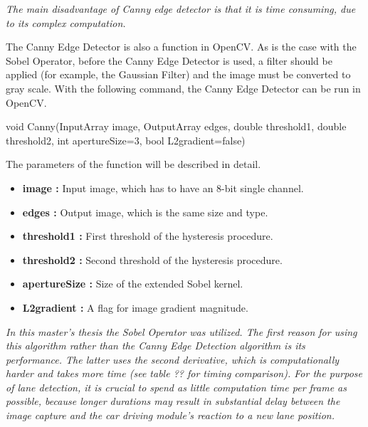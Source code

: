 \emph{\color{red}The main disadvantage of Canny edge detector is that it is time consuming, due to its complex computation. }






The Canny Edge Detector is also a function in OpenCV. As is the case with the Sobel Operator, before the Canny Edge Detector is used, a filter should be applied (for example, the Gaussian Filter) and the image must be converted to gray scale. With the following command, the Canny Edge Detector can be run in OpenCV.\cite{Canny_Edge_Detector3}

 \begin{center}
 
void Canny(InputArray image, OutputArray edges, double threshold1, double threshold2, int apertureSize=3, bool L2gradient=false)

 \end{center}
 
 The parameters of the function will be described in detail.\cite{Canny_Edge_Detector3}
 
     \begin{itemize}

\item \textbf{image : }Input image, which has to have an 8-bit single channel.

\item \textbf{edges : }Output image, which is the same size and type.

\item \textbf{threshold1 : }First threshold of the hysteresis procedure.

\item \textbf{threshold2 : }Second threshold of the hysteresis procedure.

\item \textbf{apertureSize : }Size of the extended Sobel kernel.

\item \textbf{L2gradient : }A flag for image gradient magnitude.

\end{itemize}
 
%



\emph{\color{blue}In this master's thesis the Sobel Operator was utilized. The first reason for using this algorithm rather than the Canny Edge Detection algorithm is its performance. The latter uses the second derivative, which is computationally harder and takes more time (see table ?? for timing comparison). For the purpose of lane detection, it is crucial to spend as little computation time per frame as possible, because longer durations may result in substantial delay between the image capture and the car driving module's reaction to a new lane position. }

